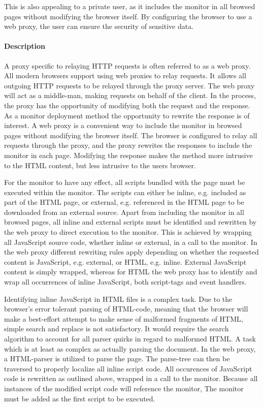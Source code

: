 \documentclass{llncs}
\begin{document}
This is also appealing to a private user, as it includes the monitor in all browsed pages without modifying 
the browser itself. By configuring the browser to use a web proxy, the user can ensure the security 
of sensitive data.

\paragraph{Description}
A proxy specific to relaying HTTP requests is often referred to as a web proxy.
All modern browsers support using web proxies to relay requests.
It allows all outgoing HTTP requests to be 
relayed through the proxy server. The web proxy will act as a middle-man, making 
requests on behalf of the client. In the process, the proxy has the 
opportunity of modifying both the request and the response. 
As a monitor deployment method the opportunity to rewrite the response is 
of interest. A web proxy is a convenient way to include the monitor in browsed pages without 
modifying the browser itself. The browser is configured to relay 
all requests through the proxy, and the proxy rewrites the responses to include 
the monitor in each page. Modifying the response makes the method more 
intrusive to the HTML content, but less intrusive to the users browser. 

For the monitor to have any effect, all scripts bundled with 
the page must be executed within the monitor. The scripts can either be inline, 
e.g. included as part of the HTML page, or external, e.g. referenced in the 
HTML page to be downloaded from an external source.
Apart from including the monitor in all browsed pages, all inline and external 
scripts must be identified and rewritten by the web proxy to direct execution to the monitor.
This is achieved by wrapping all JavaScript source code, whether inline or external, in a call to the monitor.
In the web proxy different rewriting rules apply depending on whether the 
requested content is JavaScript, e.g. external, or HTML, e.g. inline. External 
JavaScript content is simply wrapped, whereas 
for HTML the web proxy has to identify and wrap all occurrences of inline 
JavaScript, both script-tags and event handlers.



Identifying inline JavaScript in HTML files is a complex task. 
Due to the browser's error tolerant parsing of HTML-code, meaning that the 
browser will make a best-effort attempt to make sense of malformed fragments of 
HTML, simple search and replace is not satisfactory. It would require the search 
algorithm to account for all parser quirks in regard to malformed HTML.
A task which is at least as complex as actually parsing the document.
In the web proxy, a HTML-parser is utilized 
to parse the page. The parse-tree can then be traversed to properly localize 
all inline script code. All occurences of JavaScript code is rewritten as 
outlined above, wrapped in a call to the monitor.
Because all instances of the modified script code will reference the monitor, 
The monitor must be added as the first script to be executed.
\end{document}
